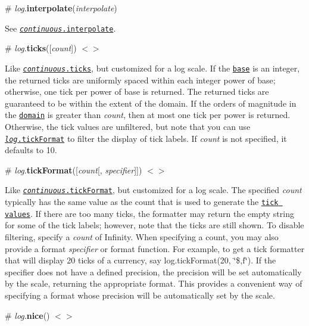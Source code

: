 \label{_log_interpolate}%
\# {\itshape log}.{\bfseries interpolate}({\itshape interpolate})

See \href{#continuous_interpolate}{\tt {\itshape continuous}.interpolate}.

\label{_log_ticks}%
\# {\itshape log}.{\bfseries ticks}(\mbox{[}{\itshape count}\mbox{]}) \href{https://github.com/d3/d3-scale/blob/master/src/log.js#L63}{\tt $<$$>$}

Like \href{#continuous_ticks}{\tt {\itshape continuous}.ticks}, but customized for a log scale. If the \href{#log_base}{\tt base} is an integer, the returned ticks are uniformly spaced within each integer power of base; otherwise, one tick per power of base is returned. The returned ticks are guaranteed to be within the extent of the domain. If the orders of magnitude in the \href{#log_domain}{\tt domain} is greater than {\itshape count}, then at most one tick per power is returned. Otherwise, the tick values are unfiltered, but note that you can use \href{#log_tickFormat}{\tt {\itshape log}.tick\+Format} to filter the display of tick labels. If {\itshape count} is not specified, it defaults to 10.

\label{_log_tickFormat}%
\# {\itshape log}.{\bfseries tick\+Format}(\mbox{[}{\itshape count}\mbox{[}, {\itshape specifier}\mbox{]}\mbox{]}) \href{https://github.com/d3/d3-scale/blob/master/src/log.js#L103}{\tt $<$$>$}

Like \href{#continuous_tickFormat}{\tt {\itshape continuous}.tick\+Format}, but customized for a log scale. The specified {\itshape count} typically has the same value as the count that is used to generate the \href{#continuous_ticks}{\tt tick values}. If there are too many ticks, the formatter may return the empty string for some of the tick labels; however, note that the ticks are still shown. To disable filtering, specify a {\itshape count} of Infinity. When specifying a count, you may also provide a format {\itshape specifier} or format function. For example, to get a tick formatter that will display 20 ticks of a currency, say {\ttfamily log.\+tick\+Format(20, \char`\"{}\$,f\char`\"{})}. If the specifier does not have a defined precision, the precision will be set automatically by the scale, returning the appropriate format. This provides a convenient way of specifying a format whose precision will be automatically set by the scale.

\label{_log_nice}%
\# {\itshape log}.{\bfseries nice}() \href{https://github.com/d3/d3-scale/blob/master/src/log.js#L116}{\tt $<$$>$}

